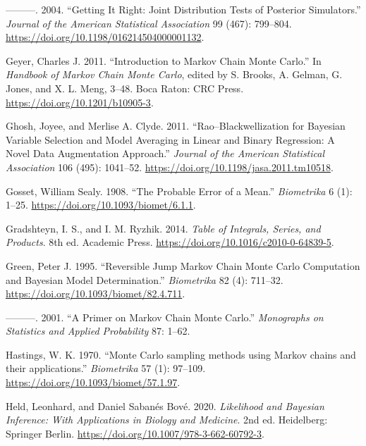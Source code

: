 \documentclass[
  11pt,
  letterpaper,
]{scrbook}
\newlength{\cslhangindent}
\newenvironment{CSLReferences}[2] %
 {\begin{list}{}{%
  \setlength{\itemindent}{0pt}
  \setlength{\leftmargin}{0pt}
  \setlength{\parsep}{0pt}
  \ifodd #1
   \setlength{\leftmargin}{\cslhangindent}
   \setlength{\itemindent}{-1\cslhangindent}
  \fi
  \setlength{\itemsep}{#2\baselineskip}}}
 {\end{list}}
\theoremstyle{definition}
\theoremstyle{plain}
\theoremstyle{plain}
\theoremstyle{plain}
\theoremstyle{definition}
\theoremstyle{definition}
\theoremstyle{remark}
\begin{document}
\begin{CSLReferences}{1}{0}
---------. 2004. {``Getting It Right: Joint Distribution Tests of
Posterior Simulators.''} \emph{Journal of the American Statistical
Association} 99 (467): 799--804.
\url{https://doi.org/10.1198/016214504000001132}.

Geyer, Charles J. 2011. {``Introduction to {M}arkov Chain {M}onte
{C}arlo.''} In \emph{Handbook of {M}arkov Chain {M}onte {C}arlo}, edited
by S. Brooks, A. Gelman, G. Jones, and X. L. Meng, 3--48. Boca Raton:
CRC Press. \url{https://doi.org/10.1201/b10905-3}.

Ghosh, Joyee, and Merlise A. Clyde. 2011. {``{R}ao--{B}lackwellization
for {B}ayesian Variable Selection and Model Averaging in Linear and
Binary Regression: A Novel Data Augmentation Approach.''} \emph{Journal
of the American Statistical Association} 106 (495): 1041--52.
\url{https://doi.org/10.1198/jasa.2011.tm10518}.

Gosset, William Sealy. 1908. {``The Probable Error of a Mean.''}
\emph{Biometrika} 6 (1): 1--25.
\url{https://doi.org/10.1093/biomet/6.1.1}.

Gradshteyn, I. S., and I. M. Ryzhik. 2014. \emph{Table of Integrals,
Series, and Products}. 8th ed. Academic Press.
\url{https://doi.org/10.1016/c2010-0-64839-5}.

Green, Peter J. 1995. {``Reversible Jump {M}arkov Chain {M}onte {C}arlo
Computation and {B}ayesian Model Determination.''} \emph{Biometrika} 82
(4): 711--32. \url{https://doi.org/10.1093/biomet/82.4.711}.

---------. 2001. {``A Primer on {M}arkov Chain {M}onte {C}arlo.''}
\emph{Monographs on Statistics and Applied Probability} 87: 1--62.

Hastings, W. K. 1970. {``{Monte {C}arlo sampling methods using {M}arkov
chains and their applications}.''} \emph{Biometrika} 57 (1): 97--109.
\url{https://doi.org/10.1093/biomet/57.1.97}.

Held, Leonhard, and Daniel Sabanés Bové. 2020. \emph{Likelihood and
{B}ayesian Inference: With Applications in Biology and Medicine}. 2nd
ed. Heidelberg: Springer Berlin.
\url{https://doi.org/10.1007/978-3-662-60792-3}.


\end{CSLReferences}
\end{document}
